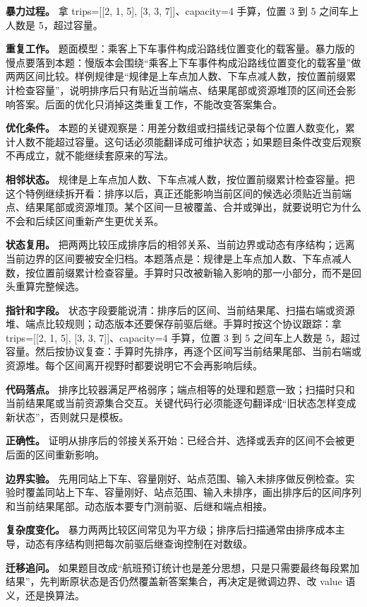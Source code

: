 \textbf{暴力过程。} 拿 trips=[[2, 1, 5], [3, 3, 7]]、capacity=4 手算，位置 3 到 5 之间车上人数是 5，超过容量。

\textbf{重复工作。} 题面模型：乘客上下车事件构成沿路线位置变化的载客量。暴力版的慢点要落到本题：慢版本会围绕“乘客上下车事件构成沿路线位置变化的载客量”做两两区间比较。样例规律是“规律是上车点加人数、下车点减人数，按位置前缀累计检查容量”，说明排序后只有贴近当前端点、结果尾部或资源堆顶的区间还会影响答案。后面的优化只消掉这类重复工作，不能改变答案集合。

\textbf{优化条件。} 本题的关键观察是：用差分数组或扫描线记录每个位置人数变化，累计人数不能超过容量。这句话必须能翻译成可维护状态；如果题目条件改变后观察不再成立，就不能继续套原来的写法。

\textbf{相邻状态。} 规律是上车点加人数、下车点减人数，按位置前缀累计检查容量。把这个特例继续拆开看：排序以后，真正还能影响当前区间的候选必须贴近当前端点、结果尾部或资源堆顶。某个区间一旦被覆盖、合并或弹出，就要说明它为什么不会和后续区间重新产生更优关系。

\textbf{状态复用。} 把两两比较压成排序后的相邻关系、当前边界或动态有序结构；远离当前边界的区间要被安全归档。本题落点是：规律是上车点加人数、下车点减人数，按位置前缀累计检查容量。手算时只改被新输入影响的那一小部分，而不是回头重算完整候选。

\textbf{指针和字段。} 状态字段要能说清：排序后的区间、当前结果尾、扫描右端或资源堆、端点比较规则；动态版本还要保存前驱后继。手算时按这个协议跟踪：拿 trips=[[2, 1, 5], [3, 3, 7]]、capacity=4 手算，位置 3 到 5 之间车上人数是 5，超过容量。然后按协议复查：手算时先排序，再逐个区间写当前结果尾部、当前右端或资源堆。每个区间离开视野时都要说明它不会再影响后续。

\textbf{代码落点。} 排序比较器满足严格弱序；端点相等的处理和题意一致；扫描时只和当前结果尾或当前资源集合交互。关键代码行必须能逐句翻译成“旧状态怎样变成新状态”，否则就只是模板。

\textbf{正确性。} 证明从排序后的邻接关系开始：已经合并、选择或丢弃的区间不会被更后面的区间重新影响。

\textbf{边界实验。} 先用同站上下车、容量刚好、站点范围、输入未排序做反例检查。实验时覆盖同站上下车、容量刚好、站点范围、输入未排序，画出排序后的区间序列和当前结果尾部。动态版本要专门测前驱、后继和端点相接。

\textbf{复杂度变化。} 暴力两两比较区间常见为平方级；排序后扫描通常由排序成本主导，动态有序结构则把每次前驱后继查询控制在对数级。

\textbf{迁移追问。} 如果题目改成“航班预订统计也是差分思想，只是只需要最终每段累加结果”，先判断原状态是否仍然覆盖新答案集合，再决定是微调边界、改 value 语义，还是换算法。


